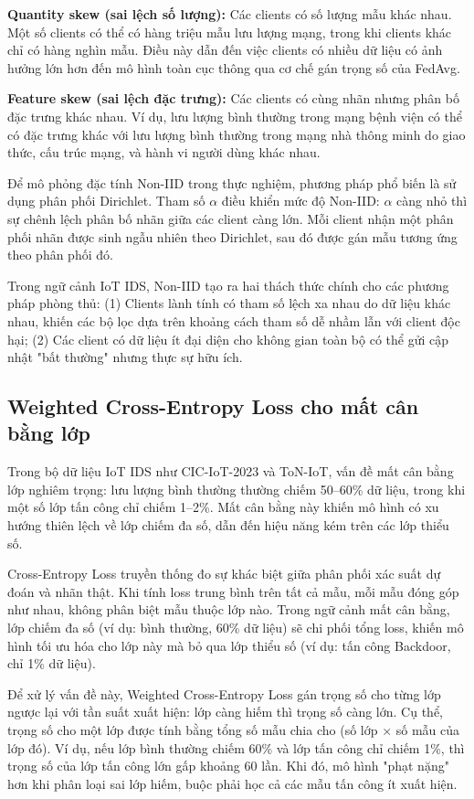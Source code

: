 \textbf{Quantity skew (sai lệch số lượng):} Các clients có số lượng mẫu khác nhau. Một số clients có thể có hàng triệu mẫu lưu lượng mạng, trong khi clients khác chỉ có hàng nghìn mẫu. Điều này dẫn đến việc clients có nhiều dữ liệu có ảnh hưởng lớn hơn đến mô hình toàn cục thông qua cơ chế gán trọng số của FedAvg.

\textbf{Feature skew (sai lệch đặc trưng):} Các clients có cùng nhãn nhưng phân bố đặc trưng khác nhau. Ví dụ, lưu lượng bình thường trong mạng bệnh viện có thể có đặc trưng khác với lưu lượng bình thường trong mạng nhà thông minh do giao thức, cấu trúc mạng, và hành vi người dùng khác nhau.

Để mô phỏng đặc tính Non-IID trong thực nghiệm, phương pháp phổ biến là sử dụng phân phối Dirichlet. Tham số $\alpha$ điều khiển mức độ Non-IID: $\alpha$ càng nhỏ thì sự chênh lệch phân bố nhãn giữa các client càng lớn. Mỗi client nhận một phân phối nhãn được sinh ngẫu nhiên theo Dirichlet, sau đó được gán mẫu tương ứng theo phân phối đó.

Trong ngữ cảnh IoT IDS, Non-IID tạo ra hai thách thức chính cho các phương pháp phòng thủ: (1) Clients lành tính có tham số lệch xa nhau do dữ liệu khác nhau, khiến các bộ lọc dựa trên khoảng cách tham số dễ nhầm lẫn với client độc hại; (2) Các client có dữ liệu ít đại diện cho không gian toàn bộ có thể gửi cập nhật "bất thường" nhưng thực sự hữu ích.

\subsection{Weighted Cross-Entropy Loss cho mất cân bằng lớp}
\label{subsec:wce_loss}
Trong bộ dữ liệu IoT IDS như CIC-IoT-2023 và ToN-IoT, vấn đề mất cân bằng lớp nghiêm trọng: lưu lượng bình thường thường chiếm 50--60\% dữ liệu, trong khi một số lớp tấn công chỉ chiếm 1--2\%. Mất cân bằng này khiến mô hình có xu hướng thiên lệch về lớp chiếm đa số, dẫn đến hiệu năng kém trên các lớp thiểu số.

Cross-Entropy Loss truyền thống đo sự khác biệt giữa phân phối xác suất dự đoán và nhãn thật. Khi tính loss trung bình trên tất cả mẫu, mỗi mẫu đóng góp như nhau, không phân biệt mẫu thuộc lớp nào. Trong ngữ cảnh mất cân bằng, lớp chiếm đa số (ví dụ: bình thường, 60\% dữ liệu) sẽ chi phối tổng loss, khiến mô hình tối ưu hóa cho lớp này mà bỏ qua lớp thiểu số (ví dụ: tấn công Backdoor, chỉ 1\% dữ liệu).

Để xử lý vấn đề này, Weighted Cross-Entropy Loss gán trọng số cho từng lớp ngược lại với tần suất xuất hiện: lớp càng hiếm thì trọng số càng lớn. Cụ thể, trọng số cho một lớp được tính bằng tổng số mẫu chia cho (số lớp $\times$ số mẫu của lớp đó). Ví dụ, nếu lớp bình thường chiếm 60\% và lớp tấn công chỉ chiếm 1\%, thì trọng số của lớp tấn công lớn gấp khoảng 60 lần. Khi đó, mô hình "phạt nặng" hơn khi phân loại sai lớp hiếm, buộc phải học cả các mẫu tấn công ít xuất hiện.

